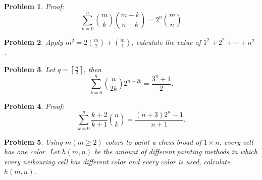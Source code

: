 \documentclass{ctexart}
\newtheorem{problem}{\textbf{Problem}}
\renewcommand{\(}{\left(}
\renewcommand{\)}{\right)}
\newcommand{\Cb}[2]{\binom{#1}{#2}}
\begin{document}
\begin{problem}
Proof:$$
\sum_{k=0}^n\Cb{m}{k}\Cb{m-k}{n-k}=2^n\Cb{m}{n}
$$
\end{problem}

\begin{problem}
Apply $m^2=2\Cb{m}{2}+\Cb{m}{1}$, calculate the value of  $1^2+2^2+\cdots+n^2$ .
\end{problem}

\begin{problem}
Let $q=\left\lceil\frac{n}{2}\right\rceil$, then
$$
\sum_{k=0}^{q}\Cb{n}{2k}2^{n-2k}=\frac{3^n+1}{2} .
$$
\end{problem}
\begin{problem}
Proof:
$$
\sum_{k=0}^n \frac{k+2}{k+1}\Cb{n}{k}=\frac{(n+3) 2^n-1}{n+1} .
$$
\end{problem}
\begin{problem}
Using $m(m \geq 2)$ colors to paint a chess broad of $1 \times n$, every cell has one color. Let $h(m, n)$ be the amount of different painting methods in which every neibouring cell has different color and every color is used, calculate $h(m, n)$.
\end{problem}





















\iffalse

$5-3$.
5-4.
5-5.
5-6.
\fi
\end{document}
